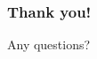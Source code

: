 \documentclass{beamer}
\begin{document}
%
%





\begin{frame}

\frametitle{Thank you!}
Any questions?

\end{frame}
\end{document}

